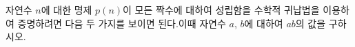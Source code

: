 자연수 $n$에 대한 명제 $p(n)$이 모든 짝수에 대하여 성립함을 수학적 귀납법을 이용하여 증명하려면 다음 두 가지를 보이면 된다.이때 자연수 $a$, $b$에 대하여 $ab$의 값을 구하시오.
